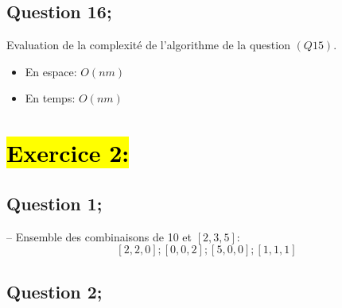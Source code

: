 \documentclass{article}
\begin{document}
\subsection*{Question 16;}

Evaluation de la complexité de l'algorithme de la question $(Q15)$.

\begin{itemize}
    \item En espace: $O(nm)$
    \item En temps: $O(nm)$
\end{itemize}

\section*{\hl{\textbf{Exercice 2:}}}

\subsection*{Question 1;}
-- Ensemble des combinaisons de 10 et $[2, 3, 5]$:
\[
    [2, 2, 0]; [0,0,2]; [5, 0, 0]; [1, 1, 1]
\]

\subsection*{Question 2;}
\end{document}
